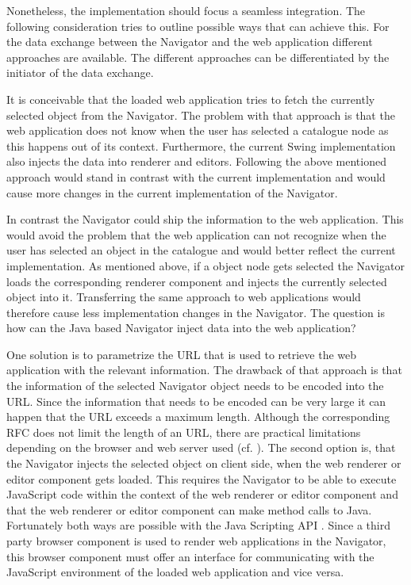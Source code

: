 Nonetheless, the implementation should focus a seamless integration.
The following consideration tries to outline possible ways that can achieve this.
For the data exchange between the Navigator and the web application different approaches are available.
The different approaches can be differentiated by the initiator of the data exchange.

It is conceivable that the loaded web application tries to fetch the currently selected object from the Navigator.
The problem with that approach is that the web application does not know when the user has selected a catalogue node as this happens out of its context. 
Furthermore, the current Swing implementation also injects the data into renderer and editors. 
Following the above mentioned approach would stand in contrast with the current implementation and would cause more changes in the current implementation of the Navigator.

In contrast the Navigator could ship the information to the web application.
This would avoid the problem that the web application can not recognize when the user has selected an object in the catalogue and would better reflect the current implementation.
As mentioned above, if a object node gets selected the Navigator loads the corresponding renderer component and injects the currently selected object into it.
Transferring the same approach to web applications would therefore cause less implementation changes in the Navigator.
The question is how can the Java based Navigator inject data into the web application? 

One solution is to parametrize the URL that is used to retrieve the web application with the relevant information.
The drawback of that approach is that the information of the selected Navigator object needs to be encoded into the URL.
Since the information that needs to be encoded can be very large it can happen that the URL exceeds a maximum length.
Although the corresponding RFC \autocite{conception:rfc-uri}  does not limit the length of an URL, there are practical limitations depending on the browser and web server used (cf. \autocite{conception:uri-length}).
The second option is, that the Navigator injects the selected object on client side, when the web renderer or editor component gets loaded.
This requires the Navigator to be able to execute JavaScript code within the context of the web renderer or editor component and that the web renderer or editor component can make method calls to Java.
Fortunately both ways are possible with the Java Scripting API \autocite{conception:rhino}.
Since a third party browser component is used to render web applications in the Navigator, this browser component must offer an interface for communicating with the JavaScript environment of the loaded web application and vice versa.

